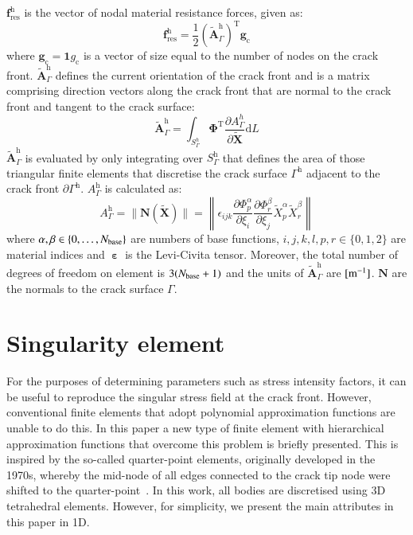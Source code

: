 \documentclass[review]{elsarticle}
\numberwithin{equation}{section}
\begin{document}
$\mathbf{f}^\textrm{h}_\textrm{res}$ is the vector of nodal material resistance forces, given as:
\begin{equation}
\mathbf{f}^\textrm{h}_\textrm{res}=\frac{1}{2}\left(\tilde{\mathbf{A}}_\Gamma^\textrm{h}\right)^\textrm{T}\mathbf{g}_\textrm{c}
\end{equation}
where $\mathbf{g}_\textrm{c}=\mathbf{1}g_\textrm{c}$ is a vector of size equal to the number of nodes on the crack front. $\tilde{\mathbf{A}}_\Gamma^\textrm{h}$ defines the current orientation of the crack front and is a matrix comprising direction vectors along the crack front that are normal to the crack front and tangent to the crack surface:
\begin{equation}
\tilde{\mathbf{A}}_\Gamma^\textrm{h} = 
\int_{S^h_\Gamma}
\pmb{\Phi}^\textrm{T} 
\frac{\partial {A}^h_{\Gamma}}{
\partial \tilde{\mathbf{X}}}
\textrm{d}L
\end{equation}
$\tilde{\mathbf{A}}_\Gamma^\textrm{h}$ is evaluated by only integrating over $S_\Gamma^\textrm{h}$ that defines the area of those triangular finite elements that discretise the crack surface $\Gamma^\textrm{h}$ adjacent to the crack front $\partial\Gamma^\textrm{h}$.
$A^\textrm{h}_{\Gamma}$ is calculated as:
\begin{equation}
A^\textrm{h}_{\Gamma} = 	
	\| \mathbf{N}(\tilde{\mathbf{X}}) \|
=
\left\| 
\epsilon_{ijk}
\frac{\partial \Phi^\alpha_p}{\partial \xi_i}  
\frac{\partial \Phi^\beta_r}{\partial \xi_j} 
\tilde{X}^\alpha_p
\tilde{X}^\beta_r
\right\|
\end{equation}
where $\alpha, \beta \in \{0, \dots, N_{\rm{base}}\}$ are numbers of base functions,
$i,j,k,l,p,r \in \{0,1,2\}$ are material indices and $\boldsymbol{\upepsilon}$ is the Levi-Civita tensor. 
Moreover, the total number of degrees of freedom on element is $3(N_{\rm{base}}+1)$ and the units of $\tilde{\mathbf{A}}_\Gamma^\textrm{h}$ are $[{\rm m}^{-1}]$. $\mathbf{N}$ are the normals to the crack surface $\Gamma$.


\section{Singularity element}
\label{sec:singularity}
For the purposes of determining parameters such as stress intensity factors, it can be useful to reproduce the singular stress field at the crack front. However, conventional finite elements that adopt polynomial approximation functions are unable to do this. 
In this paper a new type of finite element with hierarchical approximation functions that overcome this problem is briefly presented. This is inspired by the so-called quarter-point elements, originally developed in the 1970s, whereby the mid-node of all edges connected to the crack tip node were shifted to the quarter-point~\citep{barsoum1976use,henshell1975crack}. In this work, all bodies are discretised using 3D tetrahedral elements. However, for simplicity, we present the main attributes in this paper in 1D.
\end{document}
